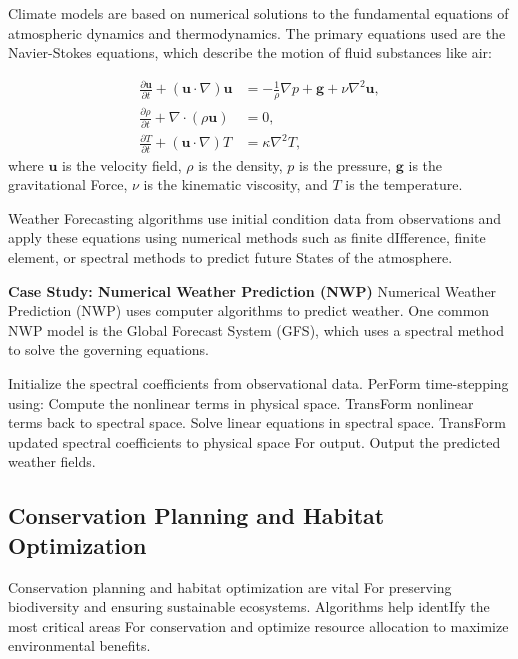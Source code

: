 \documentclass[12pt]{book} %
\begin{document}
Climate models are based on numerical solutions to the fundamental equations of atmospheric dynamics and thermodynamics. The primary equations used are the Navier-Stokes equations, which describe the motion of fluid substances like air:

\begin{align}
    \frac{\partial \mathbf{u}}{\partial t} + (\mathbf{u} \cdot \nabla) \mathbf{u} &= -\frac{1}{\rho} \nabla p + \mathbf{g} + \nu \nabla^2 \mathbf{u}, \\
    \frac{\partial \rho}{\partial t} + \nabla \cdot (\rho \mathbf{u}) &= 0, \\
    \frac{\partial T}{\partial t} + (\mathbf{u} \cdot \nabla) T &= \kappa \nabla^2 T,
\end{align}
where $\mathbf{u}$ is the velocity field, $\rho$ is the density, $p$ is the pressure, $\mathbf{g}$ is the gravitational Force, $\nu$ is the kinematic viscosity, and $T$ is the temperature.

Weather Forecasting algorithms use initial condition data from observations and apply these equations using numerical methods such as finite dIfference, finite element, or spectral methods to predict future States of the atmosphere.

\textbf{Case Study: Numerical Weather Prediction (NWP)}
Numerical Weather Prediction (NWP) uses computer algorithms to predict weather. One common NWP model is the Global Forecast System (GFS), which uses a spectral method to solve the governing equations.
\FloatBarrier
\begin{algorithm}
\caption{Spectral Method For NWP}
\begin{algorithmic}[1]
\State Initialize the spectral coefficients from observational data.
\State PerForm time-stepping using:
    \State Compute the nonlinear terms in physical space.
    \State TransForm nonlinear terms back to spectral space.
    \State Solve linear equations in spectral space.
    \State TransForm updated spectral coefficients to physical space For output.
\EndFor
\State Output the predicted weather fields.
\end{algorithmic}
\end{algorithm}
\FloatBarrier

\subsection{Conservation Planning and Habitat Optimization}
Conservation planning and habitat optimization are vital For preserving biodiversity and ensuring sustainable ecosystems. Algorithms help identIfy the most critical areas For conservation and optimize resource allocation to maximize environmental benefits.
\end{document}
